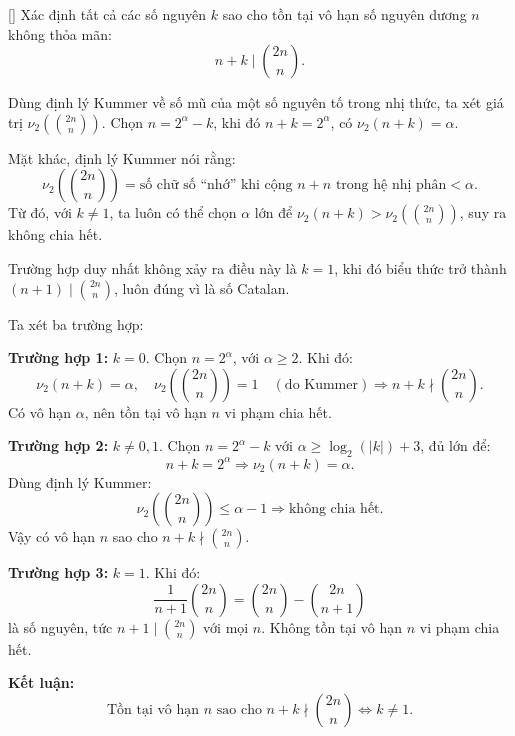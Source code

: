 \documentclass[../06-largest-exponent.tex]{subfiles}
\begin{document}
\begin{example*}\label{example:CHN-2015-MO-P4}[\textbf{}]
	Xác định tất cả các số nguyên \( k \) sao cho tồn tại vô hạn số nguyên dương \( n \) không thỏa mãn:
	\[
		n + k \mid \binom{2n}{n}.
	\]
\end{example*}

\begin{story*}
	Dùng định lý Kummer về số mũ của một số nguyên tố trong nhị thức, ta xét giá trị \( \nu_2\left( \binom{2n}{n} \right) \).  
	Chọn \( n = 2^\alpha - k \), khi đó \( n + k = 2^\alpha \), có \( \nu_2(n + k) = \alpha \).

	Mặt khác, định lý Kummer nói rằng:
	\[
		\nu_2\left( \binom{2n}{n} \right) = \text{số chữ số “nhớ” khi cộng } n + n \text{ trong hệ nhị phân} < \alpha.
	\]
	Từ đó, với \( k \ne 1 \), ta luôn có thể chọn \( \alpha \) lớn để \( \nu_2(n + k) > \nu_2\left( \binom{2n}{n} \right) \), suy ra không chia hết.

	Trường hợp duy nhất không xảy ra điều này là \( k = 1 \), khi đó biểu thức trở thành \( (n+1) \mid \binom{2n}{n} \), luôn đúng vì là số Catalan.
\end{story*}

\begin{soln}\footnotemark
	Ta xét ba trường hợp:

	\textbf{Trường hợp 1:} \(k = 0\).  
	Chọn \(n = 2^\alpha\), với \( \alpha \ge 2 \). Khi đó:
	\[
		\nu_2(n + k) = \alpha,\quad
		\nu_2\left( \binom{2n}{n} \right) = 1 \quad (\text{do Kummer})
	\Rightarrow n + k \nmid \binom{2n}{n}.
	\]
	Có vô hạn \( \alpha \), nên tồn tại vô hạn \( n \) vi phạm chia hết.

	\textbf{Trường hợp 2:} \(k \ne 0, 1\).  
	Chọn \(n = 2^\alpha - k\) với \( \alpha \ge \log_2(|k|) + 3 \), đủ lớn để:
	\[
		n + k = 2^\alpha \Rightarrow \nu_2(n + k) = \alpha.
	\]
	Dùng định lý Kummer:
	\[
		\nu_2\left( \binom{2n}{n} \right) \le \alpha - 1 \Rightarrow \text{không chia hết}.
	\]
	Vậy có vô hạn \( n \) sao cho \( n + k \nmid \binom{2n}{n} \).

	\textbf{Trường hợp 3:} \(k = 1\).  
	Khi đó:
	\[
		\frac{1}{n + 1} \binom{2n}{n} = \binom{2n}{n} - \binom{2n}{n + 1}
	\]
	là số nguyên, tức \( n + 1 \mid \binom{2n}{n} \) với mọi \( n \). Không tồn tại vô hạn \( n \) vi phạm chia hết.

	\textbf{Kết luận:}
	\[
		\boxed{\text{Tồn tại vô hạn } n \text{ sao cho } n + k \nmid \binom{2n}{n} \iff k \ne 1.}
	\]
\end{soln}

\end{document}
